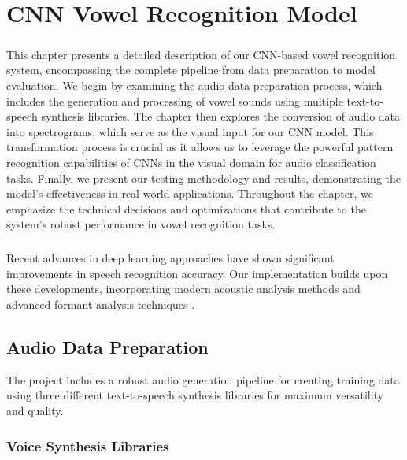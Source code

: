 
\chapter{CNN Vowel Recognition Model}
\label{chp:model}

\paragraph{}
This chapter presents a detailed description of our CNN-based vowel recognition system, encompassing the complete pipeline from data preparation to model evaluation. We begin by examining the audio data preparation process, which includes the generation and processing of vowel sounds using multiple text-to-speech synthesis libraries. The chapter then explores the conversion of audio data into spectrograms, which serve as the visual input for our CNN model. This transformation process is crucial as it allows us to leverage the powerful pattern recognition capabilities of CNNs in the visual domain for audio classification tasks. Finally, we present our testing methodology and results, demonstrating the model's effectiveness in real-world applications. Throughout the chapter, we emphasize the technical decisions and optimizations that contribute to the system's robust performance in vowel recognition tasks.

\paragraph{}
Recent advances in deep learning approaches \cite{deep_speech2023} have shown significant improvements in speech recognition accuracy. Our implementation builds upon these developments, incorporating modern acoustic analysis methods \cite{acoustic_analysis2023} and advanced formant analysis techniques \cite{formant_analysis2022}.

\section{Audio Data Preparation}
The project includes a robust audio generation pipeline for creating training data using three different text-to-speech synthesis libraries for maximum versatility and quality.

\subsection{Voice Synthesis Libraries}

